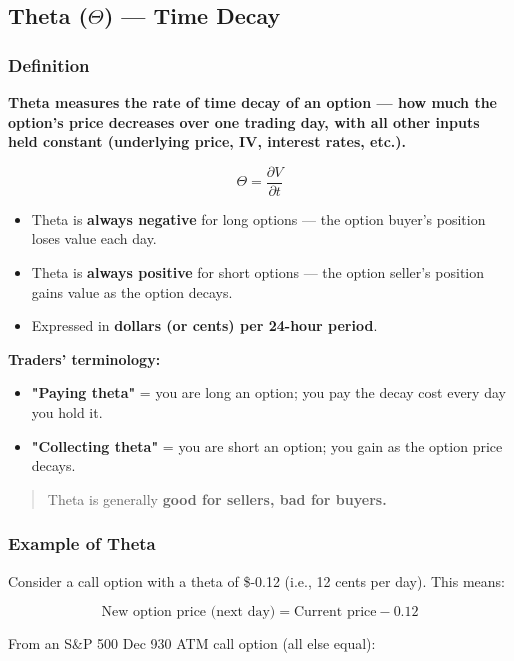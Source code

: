 \documentclass[12pt,openany]{book}
\begin{document}
\subsection{Theta (\texorpdfstring{\(\Theta\)}{Theta}) — Time Decay}

\subsubsection{Definition}

\textbf{Theta measures the rate of time decay of an option — how much the option's price decreases over one trading day, with all other inputs held constant (underlying price, IV, interest rates, etc.).}

\[
\Theta = \frac{\partial V}{\partial t}
\]

\begin{itemize}[leftmargin=*]
    \item Theta is \textbf{always negative} for long options — the option buyer's position loses value each day.
    \item Theta is \textbf{always positive} for short options — the option seller's position gains value as the option decays.
    \item Expressed in \textbf{dollars (or cents) per 24-hour period}.
\end{itemize}

\textbf{Traders' terminology:}
\begin{itemize}[leftmargin=*]
    \item \textbf{"Paying theta"} = you are long an option; you pay the decay cost every day you hold it.
    \item \textbf{"Collecting theta"} = you are short an option; you gain as the option price decays.
\end{itemize}

\begin{quote}
Theta is generally \textbf{good for sellers, bad for buyers.}
\end{quote}

\subsubsection{Example of Theta}

Consider a call option with a theta of \$-0.12 (i.e., 12 cents per day). This means:

\[
\text{New option price (next day)} = \text{Current price} - 0.12
\]

From an S\&P 500 Dec 930 ATM call option (all else equal):
\end{document}

